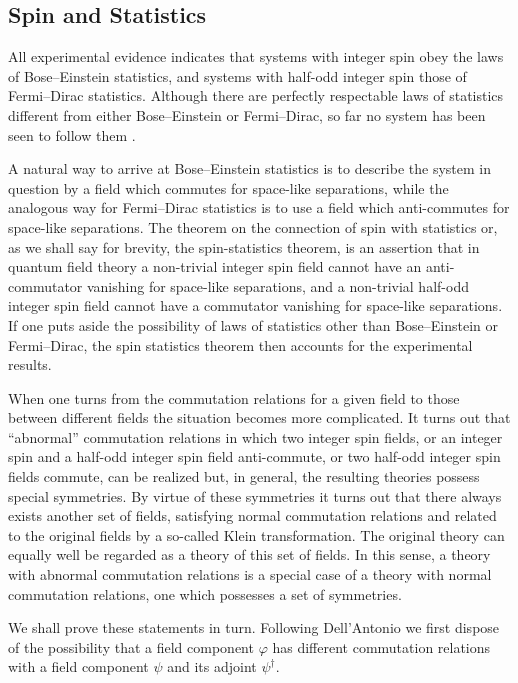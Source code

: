 \subsection{Spin and Statistics}
\label{sec:ch4-4-spin-statistics}

All experimental evidence indicates that systems with integer spin obey the
laws of Bose--Einstein statistics, and systems with half-odd integer spin those
of Fermi--Dirac statistics.  Although there are perfectly respectable laws of
statistics different from either Bose--Einstein or Fermi--Dirac, so far no
system has been seen to follow them \cite{ch4-28}.

A natural way to arrive at Bose--Einstein statistics is to describe the system
in question by a field which commutes for space-like separations, while the
analogous way for Fermi--Dirac statistics is to use a field which anti-commutes
for space-like separations.  The theorem on the connection of spin with
statistics or, as we shall say for brevity, the spin-statistics theorem, is an
assertion that in quantum field theory a non-trivial integer spin field cannot
have an anti-commutator vanishing for space-like separations, and a non-trivial
half-odd integer spin field cannot have a commutator vanishing for space-like
separations.  If one puts aside the possibility of laws of statistics other
than Bose--Einstein or Fermi--Dirac, the spin statistics theorem then accounts
for the experimental results.

When one turns from the commutation relations for a given field to those
between different fields the situation becomes more complicated.  It turns
out that “abnormal” commutation relations in which two integer spin fields, or
an integer spin and a half-odd integer spin field anti-commute, or two half-odd
integer spin fields commute, can be realized but, in general, the resulting
theories possess special symmetries.  By virtue of these symmetries it turns
out that there always exists another set of fields, satisfying normal
commutation relations and related to the original fields by a so-called Klein
transformation.  The original theory can equally well be regarded as a theory
of this set of fields.  In this sense, a theory with abnormal commutation
relations is a special case of a theory with normal commutation relations, one
which possesses a set of symmetries.

We shall prove these statements in turn.  Following Dell’Antonio we first
dispose of the possibility that a field component $\varphi$ has different
commutation relations with a field component $\psi$ and its adjoint $\psi^\dagger$.

